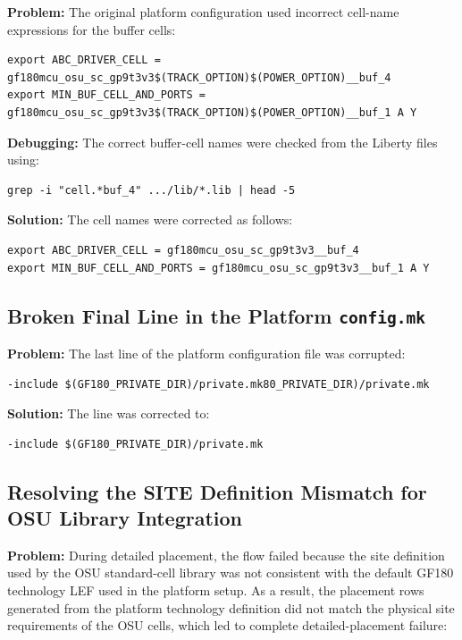 \documentclass[11pt]{article}
\begin{document}
\textbf{Problem:}  
The original platform configuration used incorrect cell-name expressions for the buffer cells:

\begin{lstlisting}
export ABC_DRIVER_CELL = gf180mcu_osu_sc_gp9t3v3$(TRACK_OPTION)$(POWER_OPTION)__buf_4
export MIN_BUF_CELL_AND_PORTS = gf180mcu_osu_sc_gp9t3v3$(TRACK_OPTION)$(POWER_OPTION)__buf_1 A Y
\end{lstlisting}

\textbf{Debugging:}  
The correct buffer-cell names were checked from the Liberty files using:

\begin{lstlisting}
grep -i "cell.*buf_4" .../lib/*.lib | head -5
\end{lstlisting}

\textbf{Solution:}  
The cell names were corrected as follows:

\begin{lstlisting}
export ABC_DRIVER_CELL = gf180mcu_osu_sc_gp9t3v3__buf_4
export MIN_BUF_CELL_AND_PORTS = gf180mcu_osu_sc_gp9t3v3__buf_1 A Y
\end{lstlisting}

\subsection{Broken Final Line in the Platform \texttt{config.mk}}

\textbf{Problem:}  
The last line of the platform configuration file was corrupted:

\begin{lstlisting}
-include $(GF180_PRIVATE_DIR)/private.mk80_PRIVATE_DIR)/private.mk
\end{lstlisting}

\textbf{Solution:}  
The line was corrected to:

\begin{lstlisting}
-include $(GF180_PRIVATE_DIR)/private.mk
\end{lstlisting}



\subsection{Resolving the SITE Definition Mismatch for OSU Library Integration}

\textbf{Problem:}  
During detailed placement, the flow failed because the site definition used by the OSU standard-cell library was not consistent with the default GF180 technology LEF used in the platform setup. As a result, the placement rows generated from the platform technology definition did not match the physical site requirements of the OSU cells, which led to complete detailed-placement failure:
\end{document}
